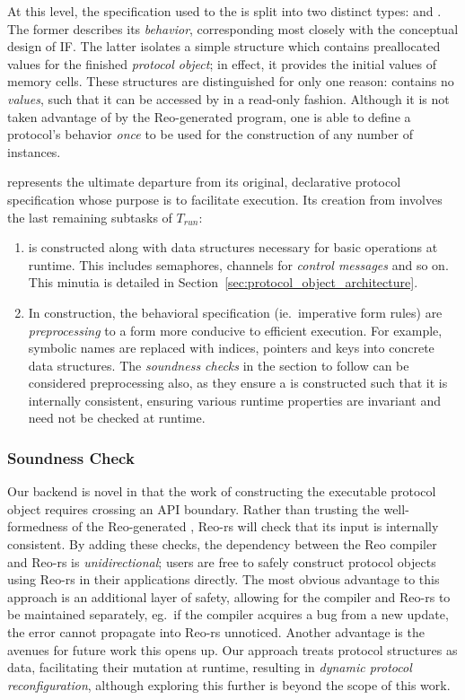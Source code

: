 At this level, the specification used to  the  is split into two distinct types:  and . The former describes its \textit{behavior}, corresponding most closely with the conceptual design of IF. The latter isolates a simple structure which contains preallocated values for the finished \textit{protocol object}; in effect, it provides the initial values of memory cells. These structures are distinguished for only one reason:  contains no \textit{values}, such that it can be accessed by  in a read-only fashion. Although it is not taken advantage of by the Reo-generated program, one is able to define a protocol's behavior \textit{once} to be used for the construction of any number of  instances.

 represents the ultimate departure from its original, declarative protocol specification whose purpose is to facilitate execution. Its creation from  involves the last remaining subtasks of $T_{run}$:
\begin{enumerate}
	\item {} is constructed along with data structures necessary for basic operations at runtime. This includes semaphores, channels for \textit{control messages} and so on. This minutia is detailed in Section~\ref{sec:protocol_object_architecture}.
	
	\item In construction, the behavioral specification (ie.\ imperative form rules) are \textit{preprocessing}  to a form more conducive to efficient execution. For example, symbolic names are replaced with indices, pointers and keys into concrete data structures. The \textit{soundness checks} in the section to follow can be considered preprocessing also, as they ensure a  is constructed such that it is internally consistent, ensuring various runtime properties are invariant and need not be checked at runtime.
\end{enumerate}


\subsubsection{Soundness Check}
Our backend is novel in that the work of constructing the executable protocol object requires crossing an API boundary. Rather than trusting the well-formedness of the Reo-generated , Reo-rs will check that its input is internally consistent. By adding these checks, the dependency between the Reo compiler and Reo-rs is \textit{unidirectional}; users are free to safely construct protocol objects using Reo-rs in their applications directly. The most obvious advantage to this approach is an additional layer of safety, allowing for the compiler and Reo-rs to be maintained separately, eg.\ if the compiler acquires a bug from a new update, the error cannot propagate into Reo-rs unnoticed. Another advantage is the avenues for future work this opens up. Our approach treats protocol structures as data, facilitating their mutation at runtime, resulting in \textit{dynamic protocol reconfiguration}, although exploring this further is beyond the scope of this work.

